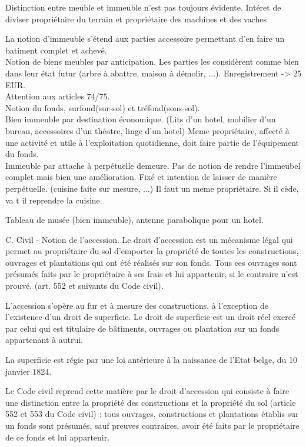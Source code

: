 \documentclass{book}
\begin{document}
Distinction entre meuble et immeuble n'est pas toujours évidente. Intéret de diviser propriétaire du terrain et propriétaire des machines et des vaches ^^\\

La notion d'immeuble s'étend aux parties accessoire permettant d'en faire un batiment complet et achevé.\\

Notion de biens meubles par anticipation. Les parties les considèrent comme bien dans leur état futur (arbre à abattre, maison à démolir, ...). Enregistrement -> 25 EUR.\\

Attention aux articles 74/75.\\

Notion du fonds, surfond(sur-sol) et tréfond(sous-sol).\\

Bien immeuble par destination économique. (Lits d'un hotel, mobilier d'un bureau, accessoires d'un théatre, linge d'un hotel) Meme propriétaire, affecté à une activité et utile à l'exploitation quotidienne, doit faire partie de l'équipement du fonds.\\

Immeuble par attache à perpétuelle demeure. Pas de notion de rendre l'immeubel complet mais bien une amélioration. Fixé et intention de laisser de manière perpétuelle. (cuisine faite sur mesure, ...) Il faut un meme propriétaire. Si il cède, va t il reprendre la cuisine.

Tableau de musée (bien immeuble), antenne parabolique pour un hotel.


C. Civil - Notion de l'accession. Le droit d’accession est un mécanisme légal qui permet au propriétaire du sol d’emporter la propriété de toutes les constructions, ouvrages et plantations qui ont été réalisés sur son fonds. Tous ces ouvrages sont présumés faits par le propriétaire à ses frais et lui appartenir, si le contraire n’est prouvé. (art. 552 et suivants du Code civil).

L’accession s’opère au fur et à mesure des constructions, à l’exception de l’existence d’un droit de superficie. Le droit de superficie est un droit réel exercé par celui qui est titulaire de bâtiments, ouvrages ou plantation sur un fonds appartenant à autrui.

La superficie est régie par une loi antérieure à la naissance de l’Etat belge, du 10 janvier 1824.

Le Code civil reprend cette matière par le droit d’accession qui consiste à faire une distinction entre la propriété des constructions et la propriété du sol (article 552 et 553 du Code civil) : tous ouvrages, constructions et plantations établis sur un fonds sont présumés, sauf preuves contraires, avoir été faits par le propriétaire de ce fonds et lui appartenir.
\end{document}

